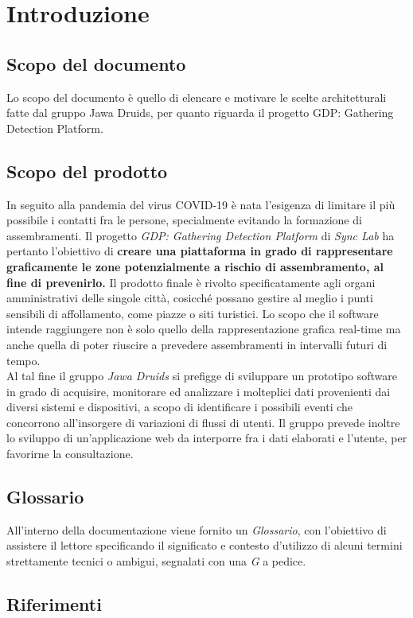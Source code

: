 \chapter{Introduzione}

\section{Scopo del documento}
Lo scopo del documento è quello di elencare e motivare le scelte architetturali fatte dal gruppo Jawa Druids, per quanto riguarda il progetto GDP: Gathering Detection Platform. 
\section{Scopo del prodotto}
In seguito alla pandemia del virus COVID-19 è nata l'esigenza di limitare il più possibile i contatti fra le persone, specialmente evitando la formazione di assembramenti. Il progetto \textit{GDP: Gathering Detection Platform} di \textit{Sync Lab} ha pertanto l'obiettivo di \textbf{creare una piattaforma in grado di rappresentare graficamente le zone potenzialmente a rischio di assembramento, al fine di prevenirlo.}
Il prodotto finale è rivolto specificatamente agli organi amministrativi delle singole città, cosicché possano gestire al meglio i punti sensibili di affollamento, come piazze o siti turistici.
Lo scopo che il software intende raggiungere non è solo quello della rappresentazione grafica real-time ma anche quella di poter riuscire a prevedere assembramenti in intervalli futuri di tempo. \\
Al tal fine il gruppo \textit{Jawa Druids} si prefigge di sviluppare un prototipo software in grado di acquisire, monitorare ed analizzare i molteplici dati provenienti dai diversi sistemi e dispositivi, a scopo di identificare i possibili eventi che concorrono all’insorgere di variazioni di flussi di utenti. Il gruppo prevede inoltre lo sviluppo di un'applicazione web da interporre fra i dati elaborati e l'utente, per favorirne la consultazione.
\section{Glossario}
All'interno della documentazione viene fornito un \textit{Glossario}, con l'obiettivo di assistere il lettore specificando il significato e contesto d'utilizzo di alcuni termini strettamente tecnici o ambigui, segnalati con una \textit{G} a pedice.
\section{Riferimenti}\label{IntroduzioneRiferimenti}
